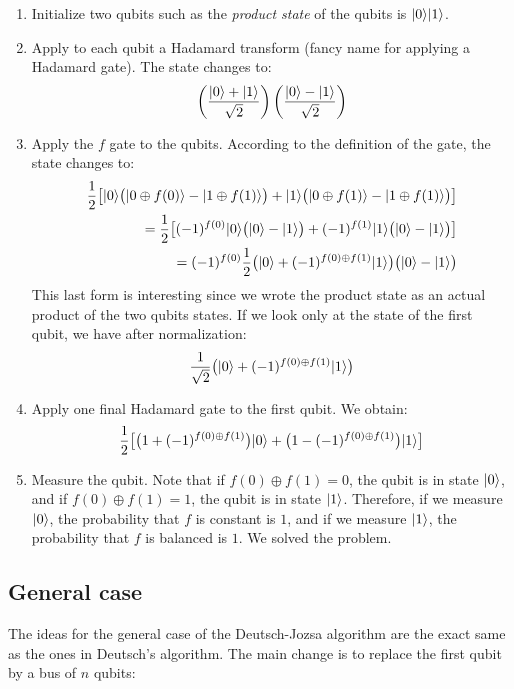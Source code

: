 \documentclass[12pt,a4paper]{article}
\theoremstyle{plain}
\theoremstyle{definition}
\DeclarePairedDelimiter\ket{\lvert}{\rangle}
\begin{document}
\begin{enumerate}
    \item Initialize two qubits such as the \emph{product state} of the qubits is $\ket{0}\ket{1}$.
    \item Apply to each qubit a Hadamard transform (fancy name for applying a Hadamard gate). The state changes to:
    \begin{equation*}
        \left(\frac{\ket{0}+\ket{1}}{\sqrt{2}}\right) \left(\frac{\ket{0}-\ket{1}}{\sqrt{2}}\right)
    \end{equation*}
    \item Apply the $f$ gate to the qubits. According to the definition of the gate, the state changes to:
    \begin{align*}
        \frac{1}{2}\big[\ket{0}\big(\ket{0\oplus f(0)} - \ket{1\oplus f(1)}\big) + \ket{1}\big(\ket{0\oplus f(1)} - \ket{1\oplus f(1)}\big) \big] \\
        = \frac{1}{2}\big[(-1)^{f(0)}\ket{0}\big(\ket{0} - \ket{1}\big) + (-1)^{f(1)}\ket{1}\big(\ket{0} - \ket{1}\big) \big] \\
        = (-1)^{f(0)}\frac{1}{2}\big( \ket{0} + (-1)^{f(0)\oplus f(1)} \ket{1}\big)\big( \ket{0}-\ket{1}\big)
    \end{align*}
    This last form is interesting since we wrote the product state as an actual product of the two qubits states. If we look only at the state of the first qubit, we have after normalization:
    \begin{equation*}
        \frac{1}{\sqrt{2}}\big(\ket{0} + (-1)^{f(0)\oplus f(1)}\ket{1}\big)
    \end{equation*}
    \item Apply one final Hadamard gate to the first qubit. We obtain:
    \begin{equation*}
        \frac{1}{2} \big[ \big(1+(-1)^{f(0)\oplus f(1)}\big)\ket{0} + \big(1-(-1)^{f(0)\oplus f(1)}\big)\ket{1} \big]
    \end{equation*}
    \item Measure the qubit. Note that if $f(0)\oplus f(1) = 0$, the qubit is in state $\ket{0}$, and if $f(0)\oplus f(1) = 1$, the qubit is in state $\ket{1}$. Therefore, if we measure $\ket{0}$, the probability that $f$ is constant is $1$, and if we measure $\ket{1}$, the probability that $f$ is balanced is $1$. We solved the problem.
\end{enumerate}

\subsection{General case}
The ideas for the general case of the Deutsch-Jozsa algorithm are the exact same as the ones in Deutsch's algorithm. The main change is to replace the first qubit by a bus of $n$ qubits:
\end{document}
